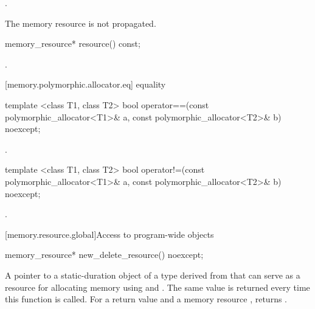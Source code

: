 \begin{itemdescr}
\pnum
\returns
{}.

\pnum
\enternote
The memory resource is not propagated.
\exitnote
\end{itemdescr}

%
%
\begin{itemdecl}
memory_resource* resource() const;
\end{itemdecl}

\begin{itemdescr}
\pnum
\returns
{}.
\end{itemdescr}

[memory.polymorphic.allocator.eq]{ equality}

%
\begin{itemdecl}
template <class T1, class T2>
  bool operator==(const polymorphic_allocator<T1>& a,
                  const polymorphic_allocator<T2>& b) noexcept;
\end{itemdecl}

\begin{itemdescr}
\pnum
\returns
{}.
\end{itemdescr}

%
\begin{itemdecl}
template <class T1, class T2>
  bool operator!=(const polymorphic_allocator<T1>& a,
                  const polymorphic_allocator<T2>& b) noexcept;
\end{itemdecl}

\begin{itemdescr}
\pnum
\returns
{}.
\end{itemdescr}


[memory.resource.global]{Access to program-wide  objects}

%
\begin{itemdecl}
memory_resource* new_delete_resource() noexcept;
\end{itemdecl}

\begin{itemdescr}
\pnum
\returns
A pointer to a static-duration object of a type derived from 
that can serve as a resource for allocating memory
using  and .
The same value is returned every time this function is called.
For a return value  and a memory resource ,
 returns .
\end{itemdescr}

